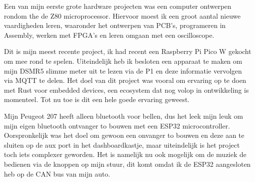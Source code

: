 \documentclass[9pt]{developercv} %
\begin{document}
\begin{minipage}[t]{0.3\textwidth}
	\vspace{-\baselineskip} %

	Een van mijn eerste grote hardware projecten was een computer ontwerpen rondom the de Z80 microprocessor.
	Hiervoor moest ik een groot aantal nieuwe vaardigheden leren, waaronder het ontwerpen van PCB's, programeren in Assembly, werken met FPGA's en leren omgaan met een oscilloscope.

	\vspace{3pt}


	\vspace{6pt}


	Dit is mijn meest recente project, ik had recent een Raspberry Pi Pico W gekocht om mee rond te spelen.
	Uiteindelijk heb ik besloten een apparaat te maken om mijn DSMR5 slimme meter uit te lezen via de P1 en deze informatie vervolgen via MQTT te delen.
	Het doel van dit project was vooral om ervaring op te doen met Rust voor embedded devices, een ecosystem dat nog volop in ontwikkeling is momenteel.
	Tot nu toe is dit een hele goede ervaring geweest.

	\vspace{3pt}

\end{minipage}
\hfill
\begin{minipage}[t]{0.3\textwidth}
	\vspace{-\baselineskip} %

	Mijn Peugeot 207 heeft alleen bluetooth voor bellen, dus het leek mijn leuk om mijn eigen bluetooth ontvanger to bouwen met een ESP32 microcontroller.
	Oorspronkelijk was het doel om gewoon een onvanger to bouwen en deze aan te sluiten op de aux port in het dashboardkastje, maar uiteindelijk is het project toch iets complexer geworden.
	Het is namelijk nu ook mogelijk om de muziek de bedienen via de knoppen op mijn stuur, dit komt omdat ik de ESP32 aangesloten heb op de CAN bus van mijn auto.

	\vspace{3pt}

\end{minipage}
\hfill
\end{document}
